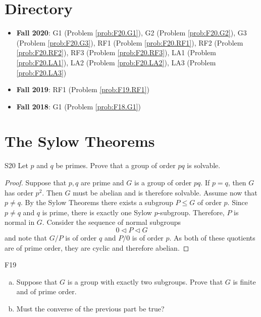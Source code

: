 \documentclass{article}
\newcommand{\normal}{\triangleleft}
\theoremstyle{definition}
\begin{document}
\tableofcontents

\section{Directory}

\begin{itemize}
\item \textbf{Fall 2020}:  	G1 (Problem \ref{prob:F20.G1}), 
							G2 (Problem \ref{prob:F20.G2}), 
							G3 (Problem \ref{prob:F20.G3}),
							RF1 (Problem \ref{prob:F20.RF1}),
							RF2 (Problem \ref{prob:F20.RF2}),
							RF3 (Problem \ref{prob:F20.RF3}),
							LA1 (Problem \ref{prob:F20.LA1}),
							LA2 (Problem \ref{prob:F20.LA2}),
							LA3 (Problem \ref{prob:F20.LA3})
\item \textbf{Fall 2019}: RF1 (Problem \ref{prob:F19.RF1})
\item \textbf{Fall 2018}: G1 (Problem \ref{prob:F18.G1})
\end{itemize}

\section{The Sylow Theorems}

	\begin{prob}{S20}{}
	Let $p$ and $q$ be primes. Prove that a group of order $pq$ is solvable.
	\end{prob}
	
	\begin{proof}
	Suppose that $p,q$ are prime and $G$ is a group of order $pq$. If $p = q$, then $G$ has order $p^2$. Then $G$ must be abelian and is therefore solvable. Assume now that $p \neq q$. By the Sylow Theorems there exists a subgroup $P \leq G$ of order $p$. Since $p \neq q$ and $q$ is prime, there is exactly one Sylow $p$-subgroup. Therefore, $P$ is normal in $G$. Consider the sequence of normal subgroups
		\[0 \normal P \normal G \]
	and note that $G/P$ is of order $q$ and $P/0$ is of order $p$. As both of these quotients are of prime order, they are cyclic and therefore abelian. 
	\end{proof}
	
	\begin{prob}{F19}{}
	\begin{enumerate}[(a)]
	\item Suppose that $G$ is a group with exactly two subgroups. Prove that $G$ is finite and of prime order.
	\item Must the converse of the previous part be true?
	\end{enumerate}
	\end{prob}
	
\end{document}
